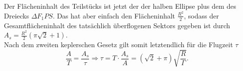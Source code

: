 \begin{Answer}[ref = cmellipse]
	Der Flächeninhalt des Teilstücks ist jetzt der der halben Ellipse plus dem des Dreiecks $\Delta F_1PS$. Das hat aber einfach den Flächeninhalt $\frac{R^2}{2}$, sodass der Gesamtflächeninhalt des tatsächlich überflogenen Sektors gegeben ist durch $A_s = \frac{R^2}{2}\left(\pi \sqrt{2} + 1\right)$.\\
	Nach dem zweiten keplerschen Gesetz gilt somit letztendlich für die Flugzeit $\tau$
	\begin{equation}
		\boxed{\frac{A}{T} = \frac{A_s}{\tau} \Rightarrow \tau = T\cdot \frac{A_s}{A} = \left(\sqrt{2}+ \pi\right) \sqrt{\frac{R}{\Gamma}}.}
	\end{equation}
\end{Answer}